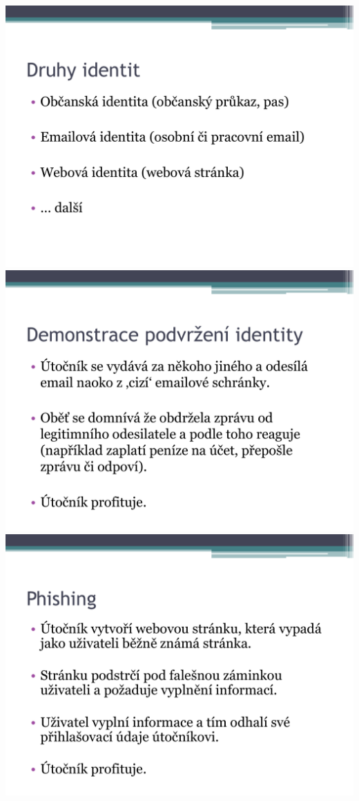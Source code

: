 \documentclass[a4paper, 12pt]{article}
\begin{document}
\includegraphics[scale=0.5]{IdentityTheftSlides/p03.pdf} \\
\vspace{0.5in}
\includegraphics[scale=0.5]{IdentityTheftSlides/p04.pdf} \\
\vspace{0.5in}
\includegraphics[scale=0.5]{IdentityTheftSlides/p05.pdf} \\
\end{document}
